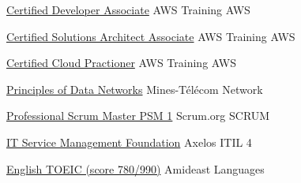 \newcommand{\urlNewWindow}[1]{\href[pdfnewwindow=true]{#1}{\nolinkurl{#1}}}




\begin{cvhonors}

  \cvhonor
    {} %
    {\href{https://www.certmetrics.com/amazon/public/badge.aspx?i=2&t=c&d=2019-08-20&ci=AWS00767474}{{\hspace{1mm} Certified Developer Associate}}}%
    {AWS Training} %
    {AWS} %

  \cvhonor
    {} %
    {\href{https://www.certmetrics.com/amazon/public/badge.aspx?i=1&t=c&d=2019-11-27&ci=AWS00767474}{{\hspace{1mm} Certified Solutions Architect Associate}}}%
    {AWS Training} %
    {AWS} %

  \cvhonor
    {} %
    {\href{https://www.certmetrics.com/amazon/public/badge.aspx?i=9&t=c&d=2019-12-07&ci=AWS00767474}{{\hspace{1mm} Certified Cloud Practioner}}}%
    {AWS Training} %
    {AWS} %

  \cvhonor
    {} %
    {\href{https://www.cvtrust.com/SmartDiploma/Default.aspx?xVyP15sFUKhhZYYSkTh/gZ+USyBrUQL+51c7cp1nHf9Qlno7xHUeqmlWDHvVj5gO}{{\hspace{1mm} Principles of Data Networks}}}%
    { Mines-Télécom } %
    {Network} %

  \cvhonor
    {} %
    {\href{https://drive.google.com/file/d/1Np0XF8Lp99kaLGcngStGzi-czhxU19N0/view}{{\hspace{1mm}Professional Scrum Master PSM 1}}} %
    {Scrum.org} %
    {SCRUM} %

  \cvhonor
    {} %
    {\href{}{{\hspace{1mm}IT Service Management Foundation}}} %
    {Axelos} %
    {ITIL 4} %

  \cvhonor
    {} %
    {\href{https://drive.google.com/file/d/0B-JcY6JJq2o8cmtWSm1ydnk1anc/view}{{\hspace{1mm} English TOEIC (score 780/990)}}}%
    {Amideast} %
    {Languages} %

\end{cvhonors}


